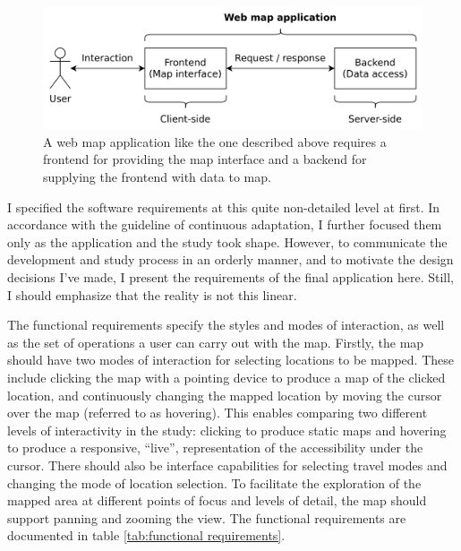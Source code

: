 \begin{figure}[H]
	\centering
	\includegraphics[width=\diagramwidth]{visual/figures/diagrams/web_map_app}
	\caption{
		A web map application like the one described above requires
		a frontend for providing the map interface
		and a backend for supplying the frontend with data to map.
	}
	\label{fig:web map app}
\end{figure}

I specified the software requirements at this quite non-detailed
level at first.
In accordance with the guideline of continuous adaptation,
\parencite{bec2001} I further focused them only as the application
and the study took shape.
However, to communicate the development and study process in an orderly manner,
and to motivate the design decisions I've made,
I present the requirements of the final application here.
Still, I should emphasize that the reality is not this linear.

The functional requirements specify the styles and modes of interaction,
as well as the set of operations a user can carry out with the map.
Firstly, the map should have two modes of interaction for selecting locations to be mapped.
These include clicking the map with a pointing device to produce a map of the clicked location,
and continuously changing the mapped location by moving the cursor over the map
(referred to as hovering).
This enables comparing two different levels of interactivity in the study:
clicking to produce static maps and hovering to produce
a responsive, \enquote{live},
representation of the accessibility under the cursor.
There should also be interface capabilities for selecting travel modes
and changing the mode of location selection.
To facilitate the exploration of the mapped area
at different points of focus and levels of detail,
the map should support panning and zooming the view.
The functional requirements are documented in table \ref{tab:functional requirements}.

